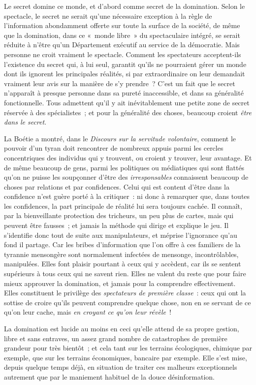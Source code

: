 \documentclass[french,twoside]{book} %
\def\bignobreak{\ifdim\lastskip<\bigskipamount
  \removelastskip\nopagebreak\bigskip\fi}
\newcommand{\labelblock}[1]{\bigbreak{\color{rubric}\noindent\textbf{#1}\par}\bignobreak}
\begin{document}
\labelblock{XXI}

\noindent Le secret domine ce monde, et d’abord comme secret de la domination. Selon le spectacle, le secret ne serait qu’une nécessaire exception à la règle de l’information abondamment offerte sur toute la surface de la société, de même que la domination, dans ce « monde libre » du spectaculaire intégré, se serait réduite à n’être qu’un Département exécutif au service de la démocratie. Mais personne ne croit vraiment le spectacle. Comment les spectateurs acceptent-ils l’existence du secret qui, à lui seul, garantit qu’ils ne pourraient gérer un monde dont ils ignorent les principales réalités, si par extraordinaire on leur demandait vraiment leur avis sur la manière de s’y prendre ? C’est un fait que le secret n’apparaît à presque personne dans sa pureté inaccessible, et dans sa généralité fonctionnelle. Tous admettent qu’il y ait inévitablement une petite zone de secret réservée à des spécialistes ; et pour la généralité des choses, beaucoup croient \emph{être dans le secret}.\par
La Boétie a montré, dans le \emph{Discours sur la servitude volontaire}, comment le pouvoir d’un tyran doit rencontrer de nombreux appuis parmi les cercles concentriques des individus qui y trouvent, ou croient y trouver, leur avantage. Et de même beaucoup de gens, parmi les politiques ou médiatiques qui sont flattés qu’on ne puisse les soupçonner d’être des \emph{irresponsables} connaissent beaucoup de choses par relations et par confidences. Celui qui est content d’être dans la confidence n’est guère porté à la critiquer : ni donc à remarquer que, dans toutes les confidences, la part principale de réalité lui sera toujours cachée. Il connaît, par la bienveillante protection des tricheurs, un peu plus de cartes, mais qui peuvent être fausses ; et jamais la méthode qui dirige et explique le jeu. Il s’identifie donc tout de suite aux manipulateurs, et méprise l’ignorance qu’au fond il partage. Car les bribes d’information que l’on offre à ces familiers de la tyrannie mensongère sont normalement infectées de mensonge, incontrôlables, manipulées. Elles font plaisir pourtant à ceux qui y accèdent, car ils se sentent supérieurs à tous ceux qui ne savent rien. Elles ne valent du reste que pour faire mieux approuver la domination, et jamais pour la comprendre effectivement. Elles constituent le privilège des \emph{spectateurs de première classe} : ceux qui ont la sottise de croire qu’ils peuvent comprendre quelque chose, non en se servant de ce qu’on leur cache, mais \emph{en croyant ce qu’on leur révèle} !\par
La domination est lucide au moins en ceci qu’elle attend de sa propre gestion, libre et sans entraves, un assez grand nombre de catastrophes de première grandeur pour très bientôt ; et cela tant sur les terrains écologiques, chimique par exemple, que sur les terrains économiques, bancaire par exemple. Elle s’est mise, depuis quelque temps déjà, en situation de traiter ces malheurs exceptionnels autrement que par le maniement habituel de la douce désinformation.\par
\end{document}
